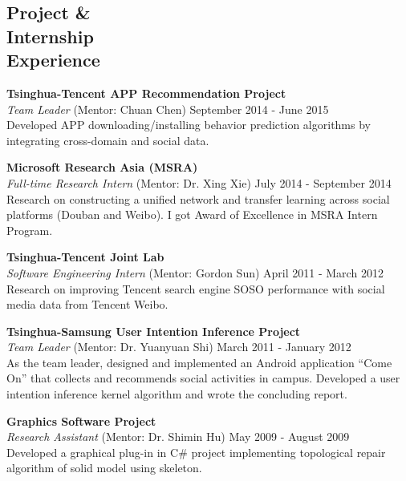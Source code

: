 \documentclass[margin, 10pt]{res} %
\begin{document}
\begin{resume}

\section{Project \& \\ Internship \\ Experience}

{\bf Tsinghua-Tencent APP Recommendation Project} \\
{\em Team Leader} (Mentor: Chuan Chen) \hfill {September 2014 - June 2015} \\
Developed APP downloading/installing behavior prediction algorithms by integrating cross-domain and social data.

{\bf Microsoft Research Asia (MSRA)} \\
{\em Full-time Research Intern} (Mentor: Dr. Xing Xie) \hfill {July 2014 - September 2014} \\
Research on constructing a unified network and transfer learning across social platforms (Douban and Weibo).
I got Award of Excellence in MSRA Intern Program.

{\bf Tsinghua-Tencent Joint Lab} \\
{\em Software Engineering Intern} (Mentor: Gordon Sun) \hfill {April 2011 - March 2012} \\
Research on improving Tencent search engine SOSO performance with social media data from Tencent Weibo.

{\bf Tsinghua-Samsung User Intention Inference Project} \\
{\em Team Leader} (Mentor: Dr. Yuanyuan Shi) \hfill {March 2011 - January 2012} \\
As the team leader, designed and implemented an Android application ``Come On'' that collects and recommends social activities in campus.
Developed a user intention inference kernel algorithm and wrote the concluding report.

{\bf Graphics Software Project} \\
{\em Research Assistant} (Mentor: Dr. Shimin Hu) \hfill {May 2009 - August 2009} \\
Developed a graphical plug-in in C\# project implementing topological repair algorithm of solid model using skeleton.


\end{resume}
\end{document}
